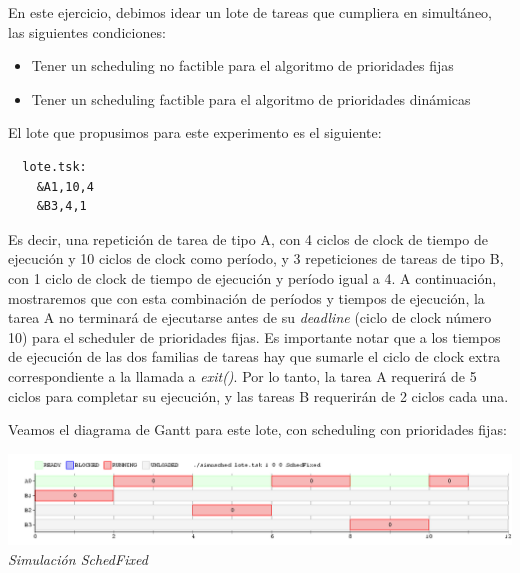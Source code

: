 En este ejercicio, debimos idear un lote de tareas que cumpliera en simult\'aneo, las siguientes condiciones:

\begin{itemize}
 \item Tener un scheduling no factible para el algoritmo de prioridades fijas
 \item Tener un scheduling factible para el algoritmo de prioridades din\'amicas
\end{itemize}

El lote que propusimos para este experimento es el siguiente:

\begin{verbatim}
  lote.tsk:
    &A1,10,4
    &B3,4,1
\end{verbatim}

Es decir, una repetici\'on de tarea de tipo A, con 4 ciclos de clock de tiempo de ejecuci\'on y 10 ciclos de clock como per\'iodo, y 3 repeticiones 
de tareas de tipo B, con 1 ciclo de clock de tiempo de ejecuci\'on y per\'iodo igual a 4. A continuaci\'on, mostraremos que con esta combinaci\'on
de per\'iodos y tiempos de ejecuci\'on, la tarea A no terminar\'a de ejecutarse antes de su \textit{deadline} (ciclo de clock n\'umero 10) 
para el scheduler de prioridades fijas. Es importante notar que a los tiempos de ejecuci\'on de las dos familias de tareas hay que sumarle el ciclo
de clock extra correspondiente a la llamada a \textit{exit()}. Por lo tanto, la tarea A requerir\'a de 5 ciclos para completar su ejecuci\'on, y las tareas 
B requerir\'an de 2 ciclos cada una.

Veamos el diagrama de Gantt para este lote, con scheduling con prioridades fijas:

\vspace{\baselineskip}
\begin{center}
\includegraphics[scale=0.45]{../tp1/Test/ejercicio9-1.png}
\\
\vspace{1pt}
\footnotesize\textit{Simulaci\'on SchedFixed}
\end{center}
\vspace{\baselineskip}

